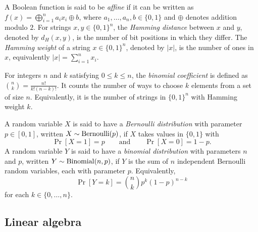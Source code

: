 A Boolean function is said to be \emph{affine} if it can be written as $f(x) = \bigoplus_{i=1}^n a_i x_i \oplus b$, where $a_1, \ldots, a_n, b \in \{0,1\}$ and $\oplus$ denotes addition modulo $2$.
For strings $x, y \in \{0,1\}^n$, the \emph{Hamming distance} between $x$ and $y$, denoted by $d_H(x,y)$, is the number of bit positions in which they differ. 
The \emph{Hamming weight} of a string $x \in \{0, 1\}^n$, denoted by $|x|$, is the number of ones in $x$, equivalently $|x|=\sum_{i=1}^n x_i$.

For integers $n$ and $k$ satisfying $0 \leq k \leq n$, the \emph{binomial coefficient} is defined as $\binom{n}{k}=\frac{n!}{k!(n-k)!}$.
It counts the number of ways to choose $k$ elements from a set of size $n$. 
Equivalently, it is the number of strings in $\{0, 1\}^n$ with Hamming weight $k$.

A random variable $X$ is said to have a \emph{Bernoulli distribution} with parameter $p \in [0,1]$, written $X \sim \operatorname{Bernoulli}(p)$, if $X$ takes values in $\{0, 1\}$ with
\begin{equation}
    \Pr[X=1]=p \qquad \text{and} \qquad \Pr[X=0]=1-p.
\end{equation}
A random variable $Y$ is said to have a \emph{binomial distribution} with parameters $n$ and $p$, written $Y \sim \operatorname{Binomial}(n,p)$,
if $Y$ is the sum of $n$ independent Bernoulli random variables, each with parameter $p$. 
Equivalently,
\begin{equation}
    \Pr[Y=k]=\binom{n}{k} p^k (1-p)^{n-k}    
\end{equation}
for each $k \in \{0, \ldots, n\}$.

\subsection{Linear algebra}

